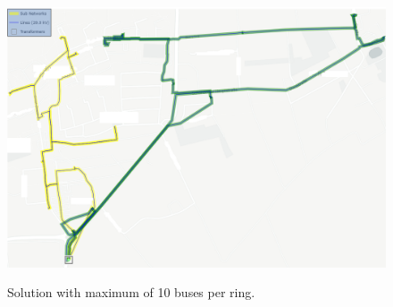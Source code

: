 \begin{figure}[h]
	\begin{centering}
		{\includegraphics[scale=0.3]{figures/experiments/ringsize/ringsize10_2.png}}
		\caption[Appendix: Max. 10 buses per ring]{Solution with maximum of 10 buses per ring.}
		\label{fig:ringsize10_2}
	\end{centering}
\end{figure}
